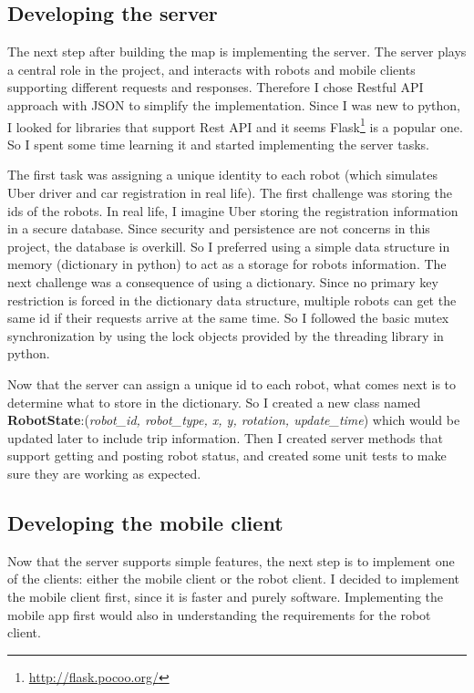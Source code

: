 \documentclass[12pt,a4paper]{article}
\begin{document}
\subsection{Developing the server}
The next step after building the map is implementing the server. The server plays a central role in the project, and interacts with robots and mobile clients supporting different requests and responses. Therefore I chose Restful API approach with JSON to simplify the implementation. Since I was new to python, I looked for libraries that support Rest API and it seems Flask\footnote{\url{http://flask.pocoo.org/}} is a popular one. So I spent some time learning it and started implementing the server tasks. 

The first task was assigning a unique identity to each robot (which simulates Uber driver and car registration in real life). The first challenge was storing the ids of the robots. In real life, I imagine Uber storing the registration information in a secure database. Since security and persistence  are not concerns in this project, the database is overkill. So I preferred using a simple data structure in memory (dictionary in python) to act as a storage for robots information. The next challenge was a consequence of using a dictionary. Since no primary key restriction is forced in the dictionary data structure, multiple robots can get the same id if their requests arrive at the same time. So I followed the basic mutex synchronization by using the lock objects provided by the threading library in python. 


Now that the server can assign a unique id to each robot, what comes next is to determine what to store in the dictionary. So I created a new class named \textbf{RobotState}:(\textit{robot\_id, robot\_type, x, y, rotation, update\_time}) which would be updated later to include trip information. Then I created server methods that support getting and posting robot status, and created some unit tests to make sure they are working as expected. 

\subsection{Developing the mobile client}

Now that the server supports simple features, the next step is to implement one of the clients: either the mobile client or the robot client. I decided to implement the mobile client first, since it is faster and purely software. Implementing the mobile app first would also in understanding the requirements for the robot client. 
\end{document}
